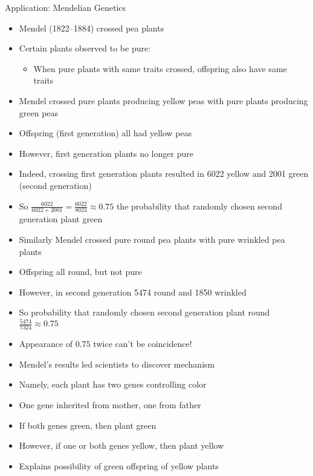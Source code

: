 \documentclass[handout]{beamer}
\theoremstyle{definition}
\begin{document}
\begin{frame}{Application: Mendelian Genetics}
\begin{itemize}
\item Mendel (1822--1884) crossed pea plants 
\item Certain plants observed to be \alert{pure}:
\begin{itemize}
\item When pure plants with same traits crossed,
offspring also have same traits
\end{itemize}
\item Mendel crossed pure plants producing yellow peas
with pure plants producing green peas
\item Offspring (\alert{first generation}) all had yellow peas
\item However, first generation plants no longer pure
\item Indeed, crossing first generation plants resulted in 
6022 yellow and 2001 green (\alert{second generation})
\item So 
$\frac{6022}{6022+2001}=\frac{6022}{8023}\approx 0.75$
the probability that randomly chosen second generation plant green
\end{itemize}
\end{frame}

\begin{frame}
\begin{itemize}
\item Similarly Mendel crossed pure round pea plants with pure wrinkled pea plants
\item Offspring all round, but not pure
\item However, in second generation 5474 round and 1850 wrinkled
\item So probability that randomly chosen second generation plant round
$\frac{5474}{7324}\approx 0.75$
\end{itemize}
\end{frame}

\begin{frame}
\begin{itemize}
\item Appearance of $0.75$ twice can't be coincidence!
\item Mendel's results led scientists to discover mechanism
\item Namely, each plant has two \alert{genes} controlling color
\item One gene inherited from mother, one from father
\item If both genes green, then plant green
\item However, if one or both genes yellow, then plant yellow
\item Explains possibility of green offspring of yellow plants
\end{itemize}
\end{frame}
\end{document}
